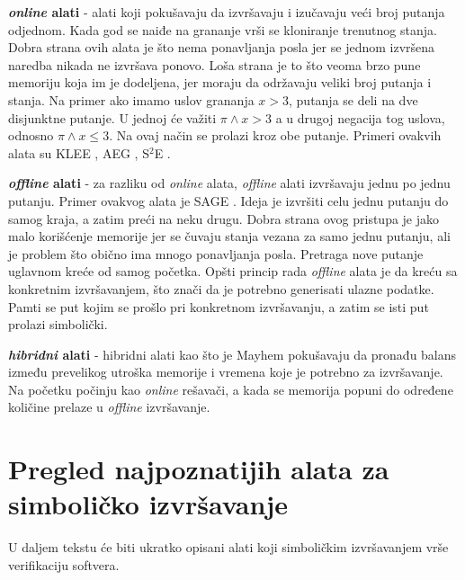 \documentclass[12pt,oneside]{memoir}
\begin{document}
\begin{description}
    \item \textbf{\textit{online} alati} - alati koji pokušavaju da izvršavaju i izučavaju veći broj putanja odjednom. Kada god se naiđe na grananje vrši se kloniranje trenutnog stanja. Dobra strana ovih alata je što nema ponavljanja posla jer se jednom izvršena naredba nikada ne izvršava ponovo. Loša strana je to što veoma brzo pune memoriju koja im je dodeljena, jer moraju da održavaju veliki broj putanja i stanja. Na primer ako imamo uslov grananja $x > 3$, putanja se deli na dve disjunktne putanje. U jednoj će važiti $\pi \land x > 3$ a u drugoj negacija tog uslova, odnosno $\pi \land x \leq 3$. Na ovaj način se prolazi kroz obe putanje. Primeri ovakvih alata su KLEE \cite{klee}, AEG \cite{aeg}, S$^2$E \cite{s2e}.
    
    \item \textbf{\textit{offline} alati} - za razliku od \textit{online} alata, \textit{offline} alati izvršavaju jednu po jednu putanju. Primer ovakvog alata je SAGE \cite{sage}. Ideja je izvršiti celu jednu putanju do samog kraja, a zatim preći na neku drugu. Dobra strana ovog pristupa je jako malo korišćenje memorije jer se čuvaju stanja vezana za samo jednu putanju, ali je problem što obično ima mnogo ponavljanja posla. Pretraga nove putanje uglavnom kreće od samog početka. Opšti princip rada \textit{offline} alata je da kreću sa konkretnim izvršavanjem, što znači da je potrebno generisati ulazne podatke. Pamti se put kojim se prošlo pri konkretnom izvršavanju, a zatim se isti put prolazi simbolički. 
    
    \item \textbf{\textit{hibridni} alati} - hibridni alati kao što je Mayhem \cite{mayhem} pokušavaju da pronađu balans između prevelikog utroška memorije i vremena koje je potrebno za izvršavanje. Na početku počinju kao \textit{online} rešavači, a kada se memorija popuni do određene količine prelaze u \textit{offline} izvršavanje.
\end{description}

\section{Pregled najpoznatijih alata za simboličko izvršavanje} \label{alati_za_simbolicko}

U daljem tekstu će biti ukratko opisani alati koji simboličkim izvršavanjem vrše verifikaciju softvera.
\end{document}

